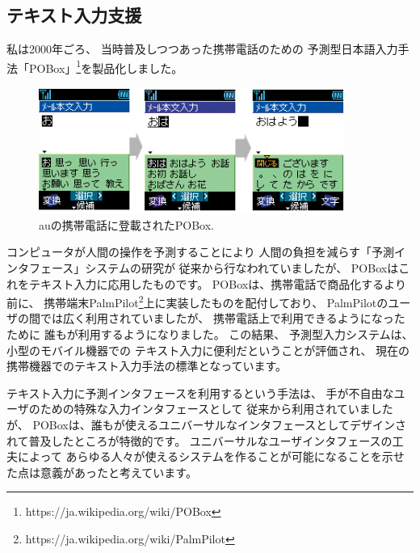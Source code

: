 \documentclass[topics]{compsoft} %
\begin{document}
\subsection{テキスト入力支援}

私は2000年ごろ、
当時普及しつつあった携帯電話のための
予測型日本語入力手法「POBox」\footnote{
  \textsf{https:{\slash}{\slash}ja.wikipedia.org{\slash}wiki{\slash}POBox}
}を製品化しました。

\begin{figure}[h]
  \includegraphics[width=10cm,bb=0 0 404 167]{figures/ac2b347a7042f920edd576ee07c4b7f4.png}
  \caption{auの携帯電話に登載されたPOBox.}
  \label{pobox}
\end{figure}

コンピュータが人間の操作を予測することにより
人間の負担を減らす「予測インタフェース」システムの研究が
従来から行なわれていましたが\cite{WatchWhatIDo}\cite{YourWish}、
POBoxはこれをテキスト入力に応用したものです。
%
POBoxは、携帯電話で商品化するより前に、
携帯端末PalmPilot\footnote{
  \textsf{https:{\slash}{\slash}ja.wikipedia.org{\slash}wiki{\slash}PalmPilot}
}上に実装したものを配付しており、
PalmPilotのユーザの間では広く利用されていましたが、
携帯電話上で利用できるようになったために
誰もが利用するようになりました。
この結果、
予測型入力システムは、小型のモバイル機器での
テキスト入力に便利だということが評価され、
現在の携帯機器でのテキスト入力手法の標準となっています。

テキスト入力に予測インタフェースを利用するという手法は、
手が不自由なユーザのための特殊な入力インタフェースとして
従来から利用されていましたが、
POBoxは、誰もが使えるユニバーサルなインタフェースとしてデザインされて普及したところが特徴的です。
ユニバーサルなユーザインタフェースの工夫によって
あらゆる人々が使えるシステムを作ることが可能になることを示せた点は意義があったと考えています。
\end{document}
